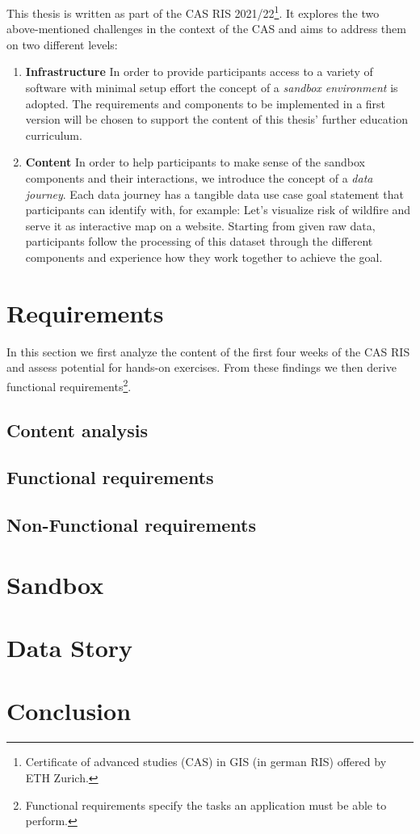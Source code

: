 \documentclass[11pt, a4paper, oneside, parskip=full-]{scrartcl}
\begin{document}
This thesis is written as part of the CAS RIS 2021/22\footnote{Certificate of advanced studies (CAS) in GIS (in german
RIS) offered by ETH Zurich.}. It explores the two above-mentioned challenges in the context of the CAS and aims to
address them on two different levels:
\begin{enumerate}
  \item \textbf{Infrastructure} In order to provide participants access to a variety of software with minimal setup
  effort the concept of a \emph{sandbox environment} is adopted. The requirements and components to be implemented in a
  first version will be chosen to support the content of this thesis' further education curriculum.
  \item \textbf{Content} In order to help participants to make sense of the sandbox components and their interactions,
  we introduce the concept of a \emph{data journey}. Each data journey has a tangible data use case goal statement that
  participants can identify with, for example: Let's visualize risk of wildfire and serve it as interactive map on a
  website. Starting from given raw data, participants follow the processing of this dataset through the different
  components and experience how they work together to achieve the goal.
\end{enumerate}


\section{Requirements}
In this section we first analyze the content of the first four weeks of the CAS RIS and assess potential for hands-on
exercises. From these findings we then derive functional requirements\footnote{Functional requirements specify the tasks
an application must be able to perform.}.


\subsection{Content analysis}


\subsection{Functional requirements}

\subsection{Non-Functional requirements}


\section{Sandbox}

\section{Data Story}

\section{Conclusion}
\end{document}
